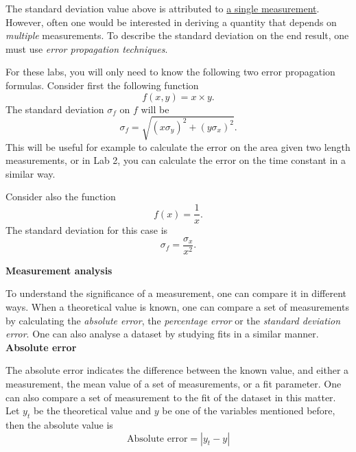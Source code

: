 \documentclass[12pt]{report}
\begin{document}
The standard deviation value above is attributed to \underline{a single measurement}. However, often one would be interested in deriving a quantity that depends on \textit{multiple} measurements. To describe the standard deviation on the end result, one must use \textit{error propagation techniques}.

For these labs, you will only need to know the following two error propagation formulas. Consider first the following function
\begin{equation}
f(x,y) = x \times y.
\end{equation}
The standard deviation $\sigma_f$ on $f$ will be
\begin{equation}
\sigma_f = \sqrt{ (x \sigma_y)^2 + (y \sigma_x)^2}.
\label{Eq:product error}
\end{equation}
This will be useful for example to calculate the error on the area given two length measurements, or in Lab 2, you can calculate the error on the time constant in a similar way.

Consider also the function
\begin{equation}
f(x) = \frac{1}{x}.
\end{equation}
The standard deviation for this case is
\begin{equation}
\sigma_f = \frac{\sigma_x}{x^2}.
\label{Eq:1/x error}
\end{equation}


\noindent \large \textbf{Measurement analysis} \normalsize

To understand the significance of a measurement, one can compare it in different ways. When a theoretical value is known, one can compare a set of measurements by calculating the \textit{absolute error}, the \textit{percentage error} or the \textit{standard deviation error}. One can also analyse a dataset by studying fits in a similar manner. \\

\noindent \textbf{Absolute error}

The absolute error indicates the difference between the known value, and either a measurement, the mean value of a set of measurements, or a fit parameter. One can also compare a set of measurement to the fit of the dataset in this matter. Let $y_t$ be the theoretical value and $y$ be one of the variables mentioned before, then the absolute value is
\begin{equation}
\text{Absolute error} = \left\rvert y_t - y \right\rvert
\end{equation}
\end{document}
